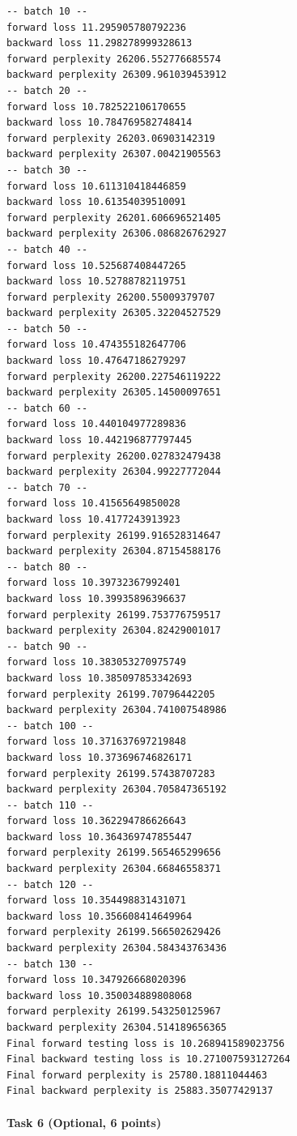 \documentclass[11pt]{article}
\begin{document}
    \begin{Verbatim}[commandchars=\\\{\}]
-- batch 10 --
forward loss 11.295905780792236
backward loss 11.298278999328613
forward perplexity 26206.552776685574
backward perplexity 26309.961039453912
-- batch 20 --
forward loss 10.782522106170655
backward loss 10.784769582748414
forward perplexity 26203.06903142319
backward perplexity 26307.00421905563
-- batch 30 --
forward loss 10.611310418446859
backward loss 10.61354039510091
forward perplexity 26201.606696521405
backward perplexity 26306.086826762927
-- batch 40 --
forward loss 10.525687408447265
backward loss 10.52788782119751
forward perplexity 26200.55009379707
backward perplexity 26305.32204527529
-- batch 50 --
forward loss 10.474355182647706
backward loss 10.47647186279297
forward perplexity 26200.227546119222
backward perplexity 26305.14500097651
-- batch 60 --
forward loss 10.440104977289836
backward loss 10.442196877797445
forward perplexity 26200.027832479438
backward perplexity 26304.99227772044
-- batch 70 --
forward loss 10.41565649850028
backward loss 10.4177243913923
forward perplexity 26199.916528314647
backward perplexity 26304.87154588176
-- batch 80 --
forward loss 10.39732367992401
backward loss 10.39935896396637
forward perplexity 26199.753776759517
backward perplexity 26304.82429001017
-- batch 90 --
forward loss 10.383053270975749
backward loss 10.385097853342693
forward perplexity 26199.70796442205
backward perplexity 26304.741007548986
-- batch 100 --
forward loss 10.371637697219848
backward loss 10.373696746826171
forward perplexity 26199.57438707283
backward perplexity 26304.705847365192
-- batch 110 --
forward loss 10.362294786626643
backward loss 10.364369747855447
forward perplexity 26199.565465299656
backward perplexity 26304.66846558371
-- batch 120 --
forward loss 10.354498831431071
backward loss 10.356608414649964
forward perplexity 26199.566502629426
backward perplexity 26304.584343763436
-- batch 130 --
forward loss 10.347926668020396
backward loss 10.350034889808068
forward perplexity 26199.543250125967
backward perplexity 26304.514189656365
Final forward testing loss is 10.268941589023756
Final backward testing loss is 10.271007593127264
Final forward perplexity is 25780.18811044463
Final backward perplexity is 25883.35077429137

    \end{Verbatim}

    \hypertarget{task-6-optional-6-points}{%
\paragraph{Task 6 (Optional, 6 points)}\label{task-6-optional-6-points}}
\end{document}
